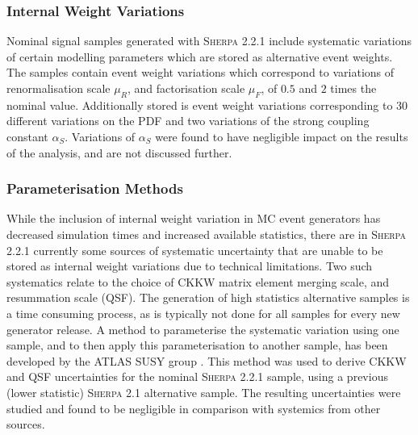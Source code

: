 \subsubsection{Internal Weight Variations}
Nominal signal samples generated with \textsc{Sherpa 2.2.1} include systematic variations of certain modelling parameters which are stored as alternative event weights. The samples contain event weight variations which correspond to variations of renormalisation scale $\mu_R$, and factorisation scale $\mu_F$, of $0.5$ and $2$ times the nominal value. Additionally stored is event weight variations corresponding to $30$ different variations on the PDF and two variations of the strong coupling constant $\alpha_S$. Variations of $\alpha_S$ were found to have negligible impact on the results of the analysis, and are not discussed further. 

\subsubsection{Parameterisation Methods}
While the inclusion of internal weight variation in MC event generators has decreased simulation times and increased available statistics, there are in \textsc{Sherpa 2.2.1} currently some sources of systematic uncertainty that are unable to be stored as internal weight variations due to technical limitations. Two such systematics relate to the choice of CKKW matrix element merging scale, and resummation scale (QSF). The generation of high statistics alternative samples is a time consuming process, as is typically not done for all samples for every new generator release. A method to parameterise the systematic variation using one sample, and to then apply this parameterisation to another sample, has been developed by the ATLAS SUSY group \cite{Anders:2125718}. This method was used to derive CKKW and QSF uncertainties for the nominal \textsc{Sherpa 2.2.1} sample, using a previous (lower statistic) \textsc{Sherpa 2.1} alternative sample. The resulting uncertainties were studied and found to be negligible in comparison with systemics from other sources.

